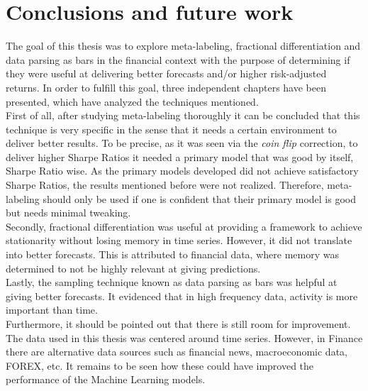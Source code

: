 \chapter{Conclusions and future work}
\label{chapterConclFutWork}
The goal of this thesis was to explore meta-labeling, fractional 
differentiation and data parsing as bars in the financial context with the 
purpose of determining if they were useful at delivering better forecasts 
and/or higher risk-adjusted returns. In order to fulfill this goal, three 
independent chapters have been presented, which have analyzed the techniques 
mentioned.\\

First of all, after studying meta-labeling thoroughly it can be concluded 
that this technique is very specific in the sense that it needs a certain 
environment to deliver better results. To be precise, as it was seen via the 
\textit{coin flip} correction, to deliver higher Sharpe Ratios it needed a 
primary model that was good by itself, Sharpe Ratio wise. As the primary 
models developed did not achieve satisfactory Sharpe Ratios, the results 
mentioned before were not realized. Therefore, meta-labeling should only be 
used if one is confident that their primary model is good but needs minimal 
tweaking.\\

Secondly, fractional differentiation was useful at providing a framework to 
achieve stationarity without losing memory in time series. However, it did 
not translate into better forecasts. This is attributed to financial data, 
where memory was determined to not be highly relevant at giving predictions.
\\

Lastly, the sampling technique known as data parsing as bars was helpful at 
giving better forecasts. It evidenced that in high frequency data, activity 
is more important than time.\\

Furthermore, it should be pointed out that there is still room for 
improvement. The data used in this thesis was centered around time series. 
However, in Finance there are alternative data sources such as financial 
news, macroeconomic data, FOREX, etc. It remains to be seen how these could 
have improved the performance of the Machine Learning models.\\

